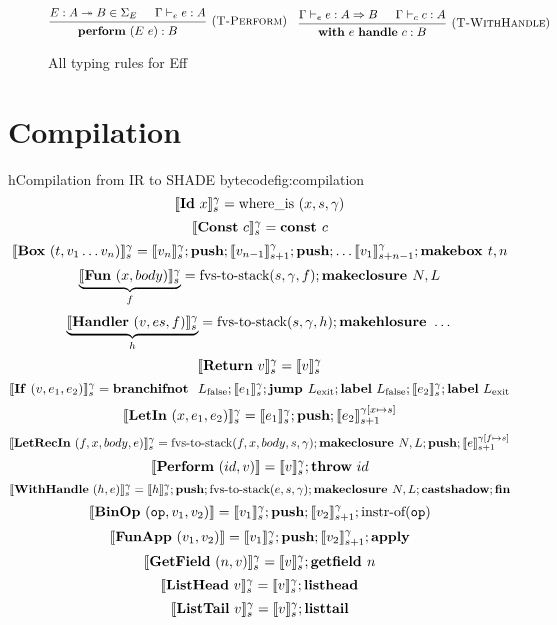 \documentclass[class=article, crop=false]{standalone}
\begin{document}
\begin{figure}[H]
    $$
    \begin{prooftree}
      \hypo{E : A \tto B \in \Sigma_E}
      \hypo{\Gamma \vdash_e e : A}
      \infer2[(\textsc{T-Perform})]{\effPerform (E\ e) : B}
    \end{prooftree}
    \quad
    \begin{prooftree}
      \hypo{\Gamma \vdash_e e : A \handlerType B}
      \hypo{\Gamma \vdash_c c : A}
      \infer2[(\textsc{T-WithHandle})]{\effWith e \effHandle c : B}
    \end{prooftree}
    $$
    
    \caption{All typing rules for Eff}
    \label{fig:full-type-checking}
  \end{figure}

\section{Compilation}

\begin{myfigure}[1]{h}{Compilation from IR to SHADE bytecode}{fig:compilation}
    $$ \interp{\irId\ x}_s^\gamma = \text{where\_is}\ (x, s, \gamma) $$
    $$ \interp{\irConst\ c}_s^\gamma = \textbf{const } c $$
    $$ \llbracket \mathbf{Box}\ (t, v_1 \dots v_n) \rrbracket_s ^ \gamma = \llbracket v_n \rrbracket_s^\gamma; \textbf{push}; \llbracket v_{n-1} \rrbracket_{s+1}^\gamma; \textbf{push}; \dots \llbracket v_1 \rrbracket_{s+n-1}^\gamma; \textbf{makebox }t, n $$
    $$ \underbrace{\llbracket \mathbf{Fun}\ (x, body) \rrbracket_s ^\gamma }_f = \text{fvs-to-stack} (s, \gamma, f); \textbf{makeclosure }N, L $$
    $$ \underbrace{\llbracket \mathbf{Handler}\ (v, es, f) \rrbracket_s^\gamma}_h = \text{fvs-to-stack} (s, \gamma, h); \textbf{makehlosure } \dots $$
    $$ \llbracket \mathbf{Return}\ v \rrbracket_s ^ \gamma =  \llbracket v \rrbracket_s ^ \gamma $$
    $$ \llbracket \mathbf{If}\ (v, e_1, e_2) \rrbracket_s ^ \gamma = \textbf{branchifnot }\ L_\text{false}; \llbracket e_1 \rrbracket_s^\gamma; \textbf{jump }L_\text{exit}; \textbf{label}\ L_\text{false}; \llbracket e_2 \rrbracket_s^\gamma; \textbf{label}\ L_\text{exit} $$
    $$ \llbracket \mathbf{LetIn}\ (x, e_1, e_2) \rrbracket_s^\gamma = \llbracket e_1 \rrbracket_s^\gamma; \textbf{push}; \llbracket e_2 \rrbracket_{s+1}^{\gamma[x \mapsto s]} $$
    $$ \llbracket \mathbf{LetRecIn}\ (f, x, body, e) \rrbracket_s^\gamma = \text{fvs-to-stack}(f, x, body, s, \gamma); \textbf{makeclosure }N, L; \textbf{push}; \llbracket e \rrbracket_{s+1}^{\gamma[f \mapsto s]} $$
    $$ \llbracket \mathbf{Perform}\ (id, v) \rrbracket = \llbracket v \rrbracket_s ^ \gamma; \textbf{throw}\ id $$
    $$ \llbracket \mathbf{WithHandle}\ (h, e) \rrbracket_s ^ \gamma = \llbracket h \rrbracket_s ^ \gamma; \textbf{push}; \text{fvs-to-stack}(e, s, \gamma); \textbf{makeclosure }N, L; \textbf{castshadow}; \textbf{fin} $$
    $$ \llbracket \mathbf{BinOp}\ (\mathtt{op}, v_1, v_2) \rrbracket = \llbracket v_1 \rrbracket_s ^ \gamma; \textbf{push}; \llbracket v_2 \rrbracket_{s+1}^\gamma; \text{instr-of} (\mathtt{op}) $$
    $$ \llbracket \mathbf{FunApp}\ (v_1, v_2) \rrbracket = \llbracket v_1 \rrbracket_s ^ \gamma; \textbf{push}; \llbracket v_2 \rrbracket_{s+1} ^ \gamma; \textbf{apply} $$
    $$ \llbracket \mathbf{GetField}\ (n, v) \rrbracket_s ^ \gamma = \llbracket v \rrbracket_s ^ \gamma; \textbf{getfield }n $$
    $$ \llbracket \mathbf{ListHead}\ v \rrbracket_s ^ \gamma = \llbracket v \rrbracket_s ^ \gamma; \textbf{listhead} $$
    $$ \llbracket \mathbf{ListTail}\ v \rrbracket_s ^ \gamma = \llbracket v \rrbracket_s ^ \gamma ; \textbf{listtail} $$
\end{myfigure}
\end{document}
